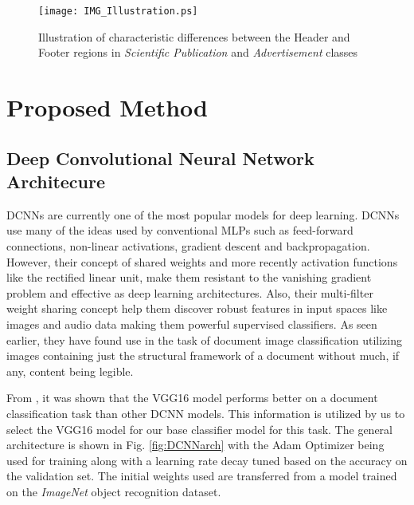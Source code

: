 \documentclass[10pt,conference,a4paper]{IEEEtran}
\begin{document}
\begin{figure}[]
	\centering
	\texttt{[image: IMG\_Illustration.ps]}
	\caption{Illustration of characteristic differences between the Header and Footer regions in \textit{Scientific Publication} and \textit{Advertisement} classes} \label{fig:classDif}
\end{figure}

\section{Proposed Method}

\subsection{Deep Convolutional Neural Network Architecure}
DCNNs are currently one of the most popular models for deep learning. DCNNs use many of the ideas used by conventional MLPs such as feed-forward connections, non-linear activations, gradient descent and backpropagation. However, their concept of shared weights and more recently activation functions like the rectified linear unit,  make them resistant to the vanishing gradient problem and effective as deep learning architectures. Also, their multi-filter weight sharing concept help them discover robust features in input spaces like images and audio data making them powerful supervised classifiers.\cite{Krizhevsky2012,sainath2013deep} As seen earlier, they have found use in the task of document image classification utilizing images containing just the structural framework of a document without much, if any, content being legible.

From \cite{tensmeyer2017analysis, csurka2016right, afzal2017cutting}, it was shown that the VGG16 model \cite{simonyan2014very} performs better on a document classification task than other DCNN models. This information is utilized by us to select the VGG16 model for our base classifier model for this task. The general architecture is shown in Fig. \ref{fig:DCNNarch} with the Adam Optimizer \cite{kingma2014adam} being used for training along with a learning rate decay tuned based on the accuracy on the validation set. The initial weights used are transferred from a model trained on the \textit{ImageNet} object recognition dataset.
\end{document}
